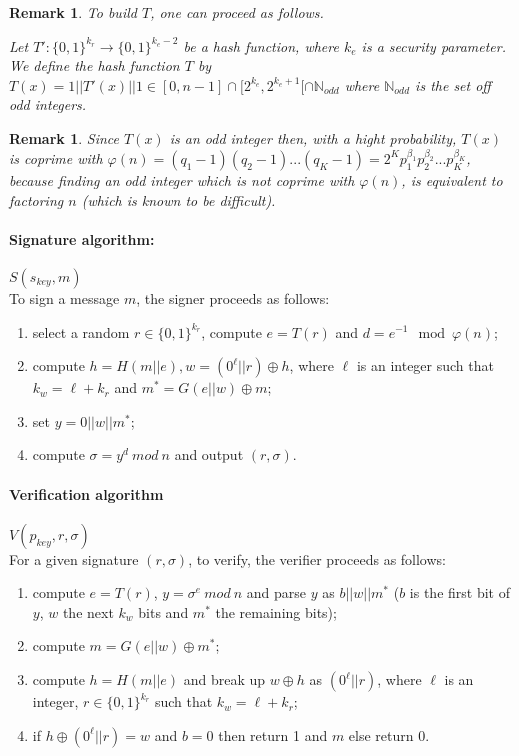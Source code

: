\documentclass[a4paper,11pt]{article}
\newtheorem{remark}[theorem]{Remark}
\begin{document}
\begin{remark} To build $T$, one can proceed as follows.

Let $ T': \{0, 1\}^{k_{r}} \rightarrow  \{0,1\}^{k_{e}-2}$ be a hash function, where $k_{e}$ is a security parameter. We
define the hash function  $T$  by $T(x)=1||T'(x)||1 \in [0, n-1] \cap [ 2^{k_{e}}, 2^{k_{e}+1}[\cap \mathbb{N}_{odd} $ where $\mathbb{N}_{odd} $ is the set off odd integers.
\end{remark}

\begin{remark}
Since $T(x)$ is an odd integer then, with a hight probability, $T(x)$ is coprime with $\varphi(n)=(q_1-1)(q_2-1)...(q_K-1)=2^Kp^{\beta_{1}}_{1}p^{\beta_{2}}_{2}...p^{\beta_{K}}_{K}$, because finding an odd integer which is not coprime with $\varphi(n)$, is equivalent to factoring $n$ (which is known to be difficult).
\end{remark}

\paragraph{Signature algorithm:}  $S(s_{key},  m)$\\
To sign a message $m$, the signer proceeds as follows:
\begin{enumerate}
\item select a random $r\in\{0,1\}^{k_r}$, compute $e=T(r)$ and $d=e^{-1} \mod \varphi(n)$;
\item compute $h=H(m||e), w=(0^{\ell}||r)\oplus h$, where $\ell$ is an integer such that $k_w=\ell +k_r$ and $m^*=G(e||w)\oplus m$;
\item set $y= 0||w||m^*$;
\item compute $\sigma = y^d \ mod \ n $ and output $(r,\sigma)$.
\end{enumerate}

\paragraph{Verification algorithm}  $V(p_{key},r,\sigma)$\\
For a given signature $(r,\sigma)$, to verify, the verifier proceeds as follows:
\begin{enumerate}
\item compute $e=T(r)$, $y= \sigma^e \ mod \ n$ and parse $y$ as $b||w||m^*$ ($b$ is the first bit of $y$,  $w$ the next $k_w$ bits and $m^*$ the remaining bits);
\item compute $m= G(e||w)\oplus m^*$;
\item compute $h=H(m||e)$ and  break up $w\oplus h$ as $(0^\ell||r)$, where $\ell$ is an integer, $r\in\{0,1\}^{k_r}$ such that $k_w=\ell+k_r$;
\item if $h\oplus (0^{\ell}||r)=w$ and $b=0$ then return 1 and $m$
else return 0.
\end{enumerate}
\end{document}
